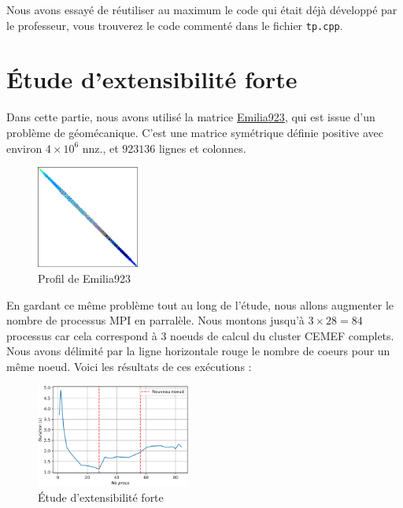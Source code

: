 \documentclass[10pt,twocolumn,letterpaper]{article}
\def\code#1{\texttt{#1}}
\begin{document}
Nous avons essayé de réutiliser au maximum le code qui était déjà développé par
le professeur, vous trouverez le code commenté dans le fichier \code{tp.cpp}.


\section{Étude d'extensibilité forte}

Dans cette partie, nous avons utilisé la matrice
\href{https://sparse.tamu.edu/Janna/Emilia_923}{Emilia923}, qui est issue d'un
problème de géomécanique. C'est une matrice symétrique définie positive avec
environ $4\times 10^6$ nnz., et $923136$ lignes et colonnes.

\begin{figure}[H]
  \centering
  \caption{Profil de Emilia923}
  \includegraphics[width=0.3\textwidth]{fig/Emilia923.png}
\end{figure}

En gardant ce même problème tout au long de l'étude, nous allons augmenter
le nombre de processus MPI en parralèle. Nous montons jusqu'à $3 \times 28 = 84$
processus car cela correspond à $3$ noeuds de calcul du cluster CEMEF complets.
Nous avons délimité par la ligne horizontale rouge le nombre de coeurs pour un
même noeud.
Voici les résultats de ces exécutions :

\begin{figure}[H]
    \centering
    \caption{Étude d'extensibilité forte}
    \includegraphics[width=0.45\textwidth]{fig/strong_scalab.png}
  \end{figure}
\end{document}
